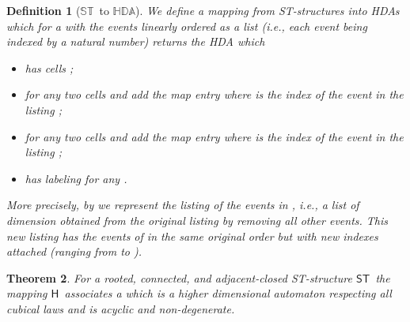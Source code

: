 \documentclass[submission,copyright,creativecommons]{eptcs}
\newtheorem{theorem}{Theorem}[section]
\newtheorem{definition}[theorem]{Definition}
\newcommand\ST{\ensuremath{\mathsf{ST}}}
\newcommand\allST{\ensuremath{\mathbb{ST}}}
\newcommand\allHDA{\ensuremath{\mathbb{HDA}}}
\newcommand\stintoh{\ensuremath{\mathsf{H}}}
\begin{document}
\begin{definition}[\allST\ to \allHDA]\label{def_STtoHDA}
We define a mapping  from ST-structures into HDAs which for a  with the events linearly ordered as a list  (i.e., each event being indexed by a natural number) returns the HDA  which
\begin{itemize}
\item has cells ;

\item for any two cells  and  add the map entry  where  is the index of the event  in the listing ;

\item for any two cells  and  add the map entry  where  is the index of the event  in the listing ;

\item has labeling  for any .
\end{itemize}
More precisely, by  we represent the listing of the events in , i.e., a list of dimension  obtained from the original listing  by removing all other events. This new listing has the events of  in the same original order but with new indexes attached (ranging from  to ).
\end{definition}

\begin{theorem}\label{th_stintohda}
For a rooted, connected, and adjacent-closed ST-structure \ST\ the mapping \stintoh\ associates a  which is a higher dimensional automaton respecting all cubical laws and is acyclic and non-degenerate.
\end{theorem}
\end{document}
